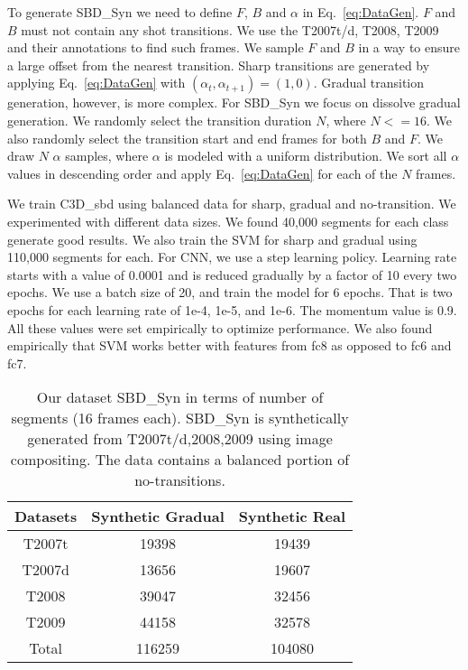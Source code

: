 \documentclass[journal]{IEEEtran}
\begin{document}
To generate SBD\_Syn we need to define $F$, $B$ and $\alpha$ in Eq.~\ref{eq:DataGen}. $F$ and $B$ must not contain any shot transitions. We use the T2007t/d, T2008, T2009 and their annotations to find such frames. We sample $F$ and $B$ in a way to ensure a large offset from the nearest transition. Sharp transitions are generated by applying Eq.~\ref{eq:DataGen} with $(\alpha_t,\alpha_{t+1})=(1,0)$. Gradual transition generation, however, is more complex. For SBD\_Syn we focus on dissolve gradual generation. We randomly select the transition duration $N$, where $N<=16$. We also randomly select the transition start and end frames for both $B$ and $F$. We draw $N$ $\alpha$ samples, where $\alpha$ is modeled with a uniform distribution. We sort all $\alpha$ values in descending order and apply Eq.~\ref{eq:DataGen} for each of the $N$ frames. 

We train C3D\_{sbd} using balanced data for sharp, gradual and no-transition. We experimented with different data sizes. We found 40,000 segments for each class generate good results. We also train the SVM for sharp and gradual using 110,000 segments for each. For CNN, we use a step learning policy. Learning rate starts with a value of 0.0001 and is reduced gradually by a factor of 10 every two epochs. We use a batch size of 20, and train the model for 6 epochs. That is two epochs for each learning rate of 1e-4, 1e-5, and 1e-6. The momentum value is 0.9. All these values were set empirically to optimize performance. We also found empirically that SVM works better with features from fc8 as opposed to fc6 and fc7. 







\begin{table}
\centering

\begin{tabular}{| c | c | c | }
     \hline      
			Datasets									    &   Synthetic  Gradual    &  Synthetic Real      \\
     \hline
T2007t            & 19398	& 19439 	\\
		     T2007d            & 13656	& 19607		\\
				 T2008              & 39047	& 32456		\\
				 T2009              & 44158	& 32578 	\\ 
\hline
Total               & 116259 & 104080   \\ 
			\hline 
    \end{tabular}\vspace{3pt}
\caption{Our dataset SBD\_Syn in terms of number of segments (16 frames each). SBD\_Syn is synthetically generated from T2007t/d,2008,2009 using image compositing. The data contains a balanced portion of no-transitions.
}
\label{tab:DeepSBDSyn}
\end{table}
\end{document}
